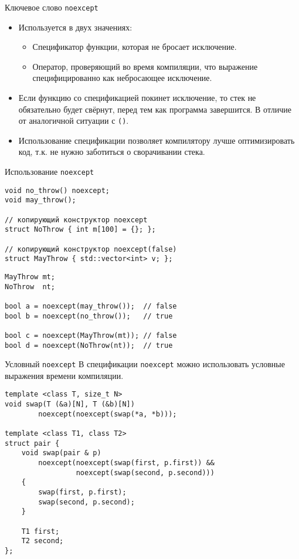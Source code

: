 \documentclass{beamer}
\begin{document}
\begin{frame}[fragile]{Ключевое слово \texttt{noexcept}}
\begin{itemize}
    \item Используется в двух значениях:
    \begin{itemize}
        \item Спецификатор функции, которая не бросает исключение.
        \item Оператор, проверяющий во время компиляции, что выражение
            специфицированно как небросающее исключение.
    \end{itemize}

\item Если функцию со спецификацией  покинет  
    исключение, то стек не обязательно будет свёрнут,  перед тем как программа завершится.   
    В отличие от аналогичной ситуации с \texttt{()}.

\item Использование спецификации  позволяет 
    компилятору лучше оптимизировать код, т.к. 
    не нужно  заботиться о сворачивании стека.
\end{itemize}

\end{frame}

\begin{frame}[fragile]{Использование \texttt{noexcept}}
    \begin{lstlisting}
void no_throw() noexcept;
void may_throw();

// копирующий конструктор noexcept
struct NoThrow { int m[100] = {}; };

// копирующий конструктор noexcept(false)
struct MayThrow { std::vector<int> v; };
    \end{lstlisting}

\begin{lstlisting}
MayThrow mt; 
NoThrow  nt;

bool a = noexcept(may_throw());  // false
bool b = noexcept(no_throw());   // true

bool c = noexcept(MayThrow(mt)); // false
bool d = noexcept(NoThrow(nt));  // true
\end{lstlisting}
\end{frame}

\begin{frame}[fragile]{Условный \texttt{noexcept}}
    В спецификации \texttt{noexcept} можно использовать 
    условные выражения времени компиляции.
\begin{lstlisting}
template <class T, size_t N>
void swap(T (&a)[N], T (&b)[N]) 
        noexcept(noexcept(swap(*a, *b)));

template <class T1, class T2>
struct pair {
    void swap(pair & p) 
        noexcept(noexcept(swap(first, p.first)) &&
                 noexcept(swap(second, p.second)))
    {
        swap(first, p.first);
        swap(second, p.second);
    }

    T1 first;
    T2 second;
};
\end{lstlisting}
\end{frame}
\end{document}
